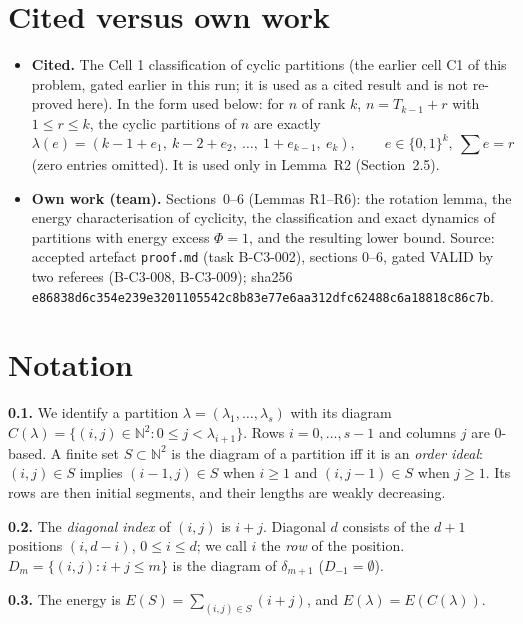 \documentclass[11pt]{article}
\theoremstyle{remark}
\newcommand{\N}{\mathbb{N}}
\begin{document}
\section*{Cited versus own work}

\begin{itemize}
\item \textbf{Cited.} The Cell 1 classification of cyclic partitions (the earlier cell C1 of this problem, gated
earlier in this run; it is used as a cited result and is not re-proved here). In the form used below: for $n$ of
rank $k$, $n=T_{k-1}+r$ with $1\le r\le k$, the cyclic partitions of $n$ are exactly
\[
\lambda(e)=(k-1+e_1,\ k-2+e_2,\ \ldots,\ 1+e_{k-1},\ e_k),\qquad e\in\{0,1\}^k,\ \textstyle\sum e=r
\]
(zero entries omitted). It is used only in Lemma~R2 (Section~2.5).
\item \textbf{Own work (team).} Sections~0--6 (Lemmas R1--R6): the rotation lemma, the energy characterisation
of cyclicity, the classification and exact dynamics of partitions with energy excess $\Phi=1$, and the resulting
lower bound. Source: accepted artefact \texttt{proof.md} (task B-C3-002), sections 0--6, gated VALID by two
referees (B-C3-008, B-C3-009); sha256\\ {\small\texttt{e86838d6c354e239e3201105542c8b83e77e6aa312dfc62488c6a18818c86c7b}}.
\end{itemize}

\setcounter{section}{-1}
\section{Notation}

\textbf{0.1.} We identify a partition $\lambda=(\lambda_1,\dots,\lambda_s)$ with its diagram
$C(\lambda)=\{(i,j)\in\N^2: 0\le j<\lambda_{i+1}\}$. Rows $i=0,\dots,s-1$ and columns $j$ are 0-based. A finite set
$S\subset\N^2$ is the diagram of a partition iff it is an \emph{order ideal}: $(i,j)\in S$ implies $(i-1,j)\in S$
when $i\ge1$ and $(i,j-1)\in S$ when $j\ge1$. Its rows are then initial segments, and their lengths are weakly
decreasing.

\textbf{0.2.} The \emph{diagonal index} of $(i,j)$ is $i+j$. Diagonal $d$ consists of the $d+1$ positions
$(i,d-i)$, $0\le i\le d$; we call $i$ the \emph{row} of the position. $D_m=\{(i,j):i+j\le m\}$ is the diagram of
$\delta_{m+1}$ ($D_{-1}=\emptyset$).

\textbf{0.3.} The energy is $E(S)=\sum_{(i,j)\in S}(i+j)$, and $E(\lambda)=E(C(\lambda))$.
\end{document}
